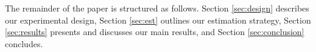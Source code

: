 \documentclass[11pt]{article}
\begin{document}
	The remainder of the paper is structured as follows. Section \ref{sec:design} describes our experimental design, Section \ref{sec:est} outlines our estimation strategy, Section \ref{sec:results} presents and discusses our main results, and Section \ref{sec:conclusion} concludes.





\end{document}
